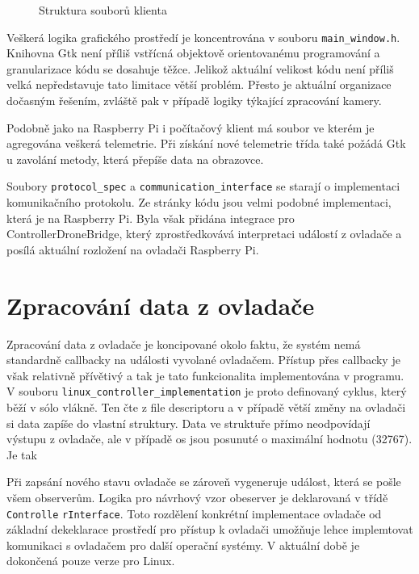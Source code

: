 \documentclass[a4paper,oneside,12pt]{report}
\begin{document}
\begin{figure}[h]
  \caption[Struktura souborů klienta]{Struktura souborů klienta}
\end{figure}

Veškerá logika grafického prostředí je koncentrována v souboru \verb|main_window.h|.
Knihovna Gtk není příliš vstřícná objektově orientovanému programování a granularizace kódu se dosahuje těžce.
Jelikož aktuální velikost kódu není příliš velká nepředstavuje tato limitace větší problém.
Přesto je aktuální organizace dočasným řešením, zvláště pak v případě logiky týkající zpracování kamery.

Podobně jako na Raspberry Pi i počítačový klient má soubor ve kterém je agregována veškerá telemetrie.
Při získání nové telemetrie třída také požádá Gtk u zavolání metody, která přepíše data na obrazovce.

Soubory \verb|protocol_spec| a \verb|communication_interface| se starají o implementaci komunikačního protokolu.
Ze stránky kódu jsou velmi podobné implementaci, která je na Raspberry Pi.
Byla však přidána integrace pro ControllerDroneBridge, který zprostředkovává interpretaci událostí z ovladače a posílá aktuální rozložení na ovladači Raspberry Pi.

\section{Zpracování data z ovladače}

Zpracování data z ovladače je koncipované okolo faktu, že systém nemá standardně callbacky na události vyvolané ovladačem.
Přístup přes callbacky je však relativně přívětivý a tak je tato funkcionalita implementována v programu.
V souboru \verb|linux_controller_implementation| je proto definovaný cyklus, který běží v sólo vlákně.
Ten čte z file descriptoru a v případě větší změny na ovladači si data zapíše do vlastní struktury.
Data ve struktuře přímo neodpovídají výstupu z ovladače, ale v případě os jsou posunuté o maximální hodnotu (32767).
Je tak

Při zapsání nového stavu ovladače se zároveň vygeneruje událost, která se pošle všem observerům.
Logika pro návrhový vzor obeserver je deklarovaná v třídě \verb|Controlle|
\verb|rInterface|.
Toto rozdělení konkrétní implementace ovladače od základní dekeklarace prostředí pro přístup k ovladači umožňuje lehce implemtovat komunikaci s ovladačem pro další operační systémy.
V aktuální době je dokončená pouze verze pro Linux.
\end{document}
